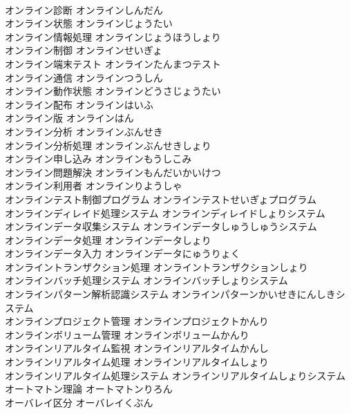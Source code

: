 \documentclass[8pt]{extreport}
\begin{document}
\begin{CJK}{UTF8}{min}
\\	オンライン診断	オンラインしんだん	
\\	オンライン状態	オンラインじょうたい	
\\	オンライン情報処理	オンラインじょうほうしょり	
\\	オンライン制御	オンラインせいぎょ	
\\	オンライン端末テスト	オンラインたんまつテスト	
\\	オンライン通信	オンラインつうしん	
\\	オンライン動作状態	オンラインどうさじょうたい	
\\	オンライン配布	オンラインはいふ	
\\	オンライン版	オンラインはん	
\\	オンライン分析	オンラインぶんせき	
\\	オンライン分析処理	オンラインぶんせきしょり	
\\	オンライン申し込み	オンラインもうしこみ	
\\	オンライン問題解決	オンラインもんだいかいけつ	
\\	オンライン利用者	オンラインりようしゃ	
\\	オンラインテスト制御プログラム	オンラインテストせいぎょプログラム	
\\	オンラインディレイド処理システム	オンラインディレイドしょりシステム	
\\	オンラインデータ収集システム	オンラインデータしゅうしゅうシステム	
\\	オンラインデータ処理	オンラインデータしょり	
\\	オンラインデータ入力	オンラインデータにゅうりょく	
\\	オンライントランザクション処理	オンライントランザクションしょり	
\\	オンラインバッチ処理システム	オンラインバッチしょりシステム	
\\	オンラインパターン解析認識システム	オンラインパターンかいせきにんしきシステム	
\\	オンラインプロジェクト管理	オンラインプロジェクトかんり	
\\	オンラインボリューム管理	オンラインボリュームかんり	
\\	オンラインリアルタイム監視	オンラインリアルタイムかんし	
\\	オンラインリアルタイム処理	オンラインリアルタイムしょり	
\\	オンラインリアルタイム処理システム	オンラインリアルタイムしょりシステム	
\\	オートマトン理論	オートマトンりろん	
\\	オーバレイ区分	オーバレイくぶん	

\end{CJK}
\end{document}
